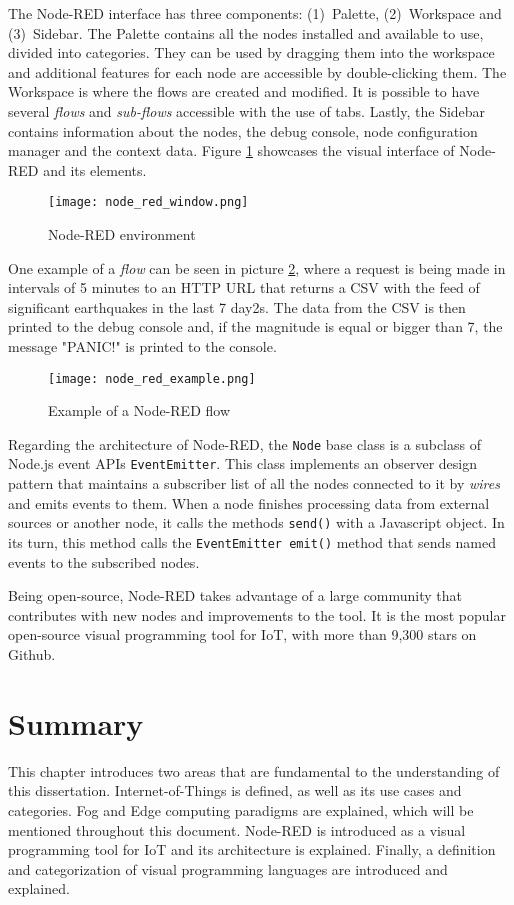 The Node-RED interface has three components: (1)~Palette, (2)~Workspace and (3)~Sidebar. The Palette contains all the nodes installed and available to use, divided into categories. They can be used by dragging them into the workspace and additional features for each node are accessible by double-clicking them. The Workspace is where the flows are created and modified. It is possible to have several \emph{flows} and \emph{sub-flows} accessible with the use of tabs. Lastly, the Sidebar contains information about the nodes, the debug console, node configuration manager and the context data. Figure \ref{fig:node_red_window} showcases the visual interface of Node-RED and its elements.

\begin{figure}[h]
\centering
\texttt{[image: node\_red\_window.png]}
\caption{Node-RED environment}
\label{fig:node_red_window}
\end{figure}

One example of a \emph{flow} can be seen in picture \ref{fig:node_red_example}, where a request is being made in intervals of 5 minutes to an HTTP URL that returns a CSV with the feed of significant earthquakes in the last 7 day2s. The data from the CSV is then printed to the debug console and, if the magnitude is equal or bigger than 7, the message "PANIC!" is printed to the console. 

\begin{figure}[!ht]
\centering
\texttt{[image: node\_red\_example.png]}
\caption{Example of a Node-RED flow}
\label{fig:node_red_example}
\end{figure}

Regarding the architecture of Node-RED, the \texttt{Node} base class is a subclass of Node.js event APIs \texttt{EventEmitter}. This class implements an observer design pattern that maintains a subscriber list of all the nodes connected to it by \emph{wires} and emits events to them. When a node finishes processing data from external sources or another node, it calls the methods \texttt{send()} with a Javascript object. In its turn, this method calls the \texttt{EventEmitter emit()} method that sends named events to the subscribed nodes. 

Being open-source, Node-RED takes advantage of a large community that contributes with new nodes and improvements to the tool. It is the most popular open-source visual programming tool for IoT, with more than 9,300 stars on Github.

\section{Summary}

This chapter introduces two areas that are fundamental to the understanding of this dissertation. Internet-of-Things is defined, as well as its use cases and categories. Fog and Edge computing paradigms are explained, which will be mentioned throughout this document. Node-RED is introduced as a visual programming tool for IoT and its architecture is explained. Finally, a definition and categorization of visual programming languages are introduced and explained.
